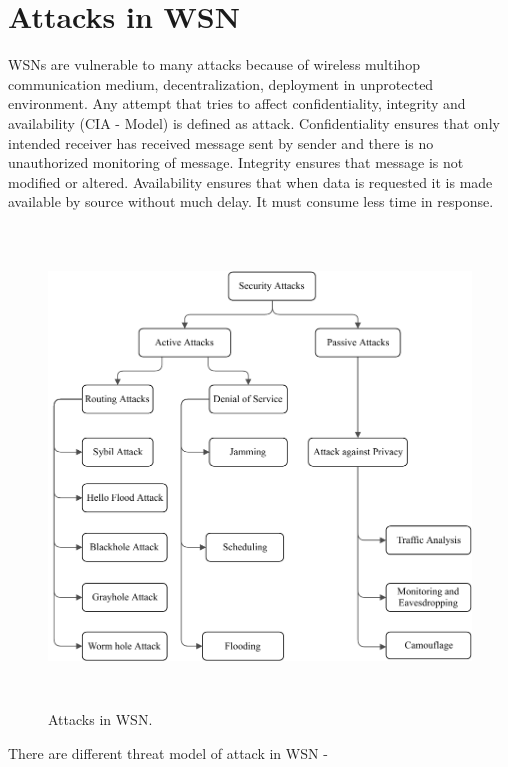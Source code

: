 \section{Attacks in WSN} \label{S2.2}
WSNs are vulnerable to many attacks because of wireless multihop communication medium, decentralization, deployment in unprotected environment. Any attempt that tries to affect confidentiality, integrity and availability (CIA - Model) is defined as attack. Confidentiality ensures that only intended receiver has received message sent by sender and there is no unauthorized monitoring of message. Integrity ensures that message is not modified or altered. Availability ensures that when data is requested it is made available by source without much delay. It must consume less time in response.
\begin{figure}[ht]
\center	
\includegraphics[width=5in, height=5in]{Figures/PDF/WSN-attacks.pdf}
\caption{Attacks in WSN.}
\label{WSN-Attacks}	
\end{figure}
\noindent
There are different threat model of attack in WSN \cite{roosta2006taxonomy}- \\
